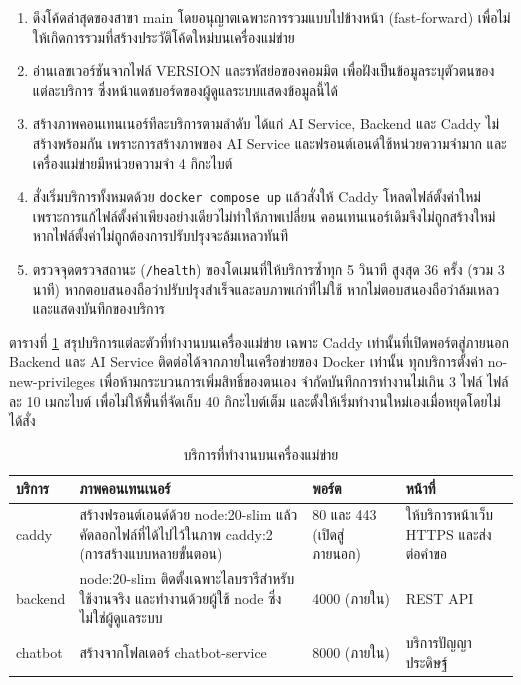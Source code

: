 \begin{enumerate}[label=(\arabic*),leftmargin=0pt,itemindent=\dimexpr\parindent+\parenlabelwidth+1em\relax,align=right,labelwidth=\parenlabelwidth,labelsep=1em]
\item ดึงโค้ดล่าสุดของสาขา main โดยอนุญาตเฉพาะการรวมแบบไปข้างหน้า (fast-forward) เพื่อไม่ให้เกิดการรวมที่สร้างประวัติโค้ดใหม่บนเครื่องแม่ข่าย
\item อ่านเลขเวอร์ชันจากไฟล์ VERSION และรหัสย่อของคอมมิต เพื่อฝังเป็นข้อมูลระบุตัวตนของแต่ละบริการ ซึ่งหน้าแดชบอร์ดของผู้ดูแลระบบแสดงข้อมูลนี้ได้
\item สร้างภาพคอนเทนเนอร์ทีละบริการตามลำดับ ได้แก่ AI Service, Backend และ Caddy ไม่สร้างพร้อมกัน เพราะการสร้างภาพของ AI Service และฟรอนต์เอนด์ใช้หน่วยความจำมาก และเครื่องแม่ข่ายมีหน่วยความจำ 4 กิกะไบต์
\item สั่งเริ่มบริการทั้งหมดด้วย \texttt{docker compose up} แล้วสั่งให้ Caddy โหลดไฟล์ตั้งค่าใหม่ เพราะการแก้ไฟล์ตั้งค่าเพียงอย่างเดียวไม่ทำให้ภาพเปลี่ยน คอนเทนเนอร์เดิมจึงไม่ถูกสร้างใหม่ หากไฟล์ตั้งค่าไม่ถูกต้องการปรับปรุงจะล้มเหลวทันที
\item ตรวจจุดตรวจสถานะ (\texttt{/health}) ของโดเมนที่ให้บริการซ้ำทุก 5 วินาที สูงสุด 36 ครั้ง (รวม 3 นาที) หากตอบสนองถือว่าปรับปรุงสำเร็จและลบภาพเก่าที่ไม่ใช้ หากไม่ตอบสนองถือว่าล้มเหลวและแสดงบันทึกของบริการ
\end{enumerate}

ตารางที่ \ref{tab:deploy_services} สรุปบริการแต่ละตัวที่ทำงานบนเครื่องแม่ข่าย เฉพาะ Caddy เท่านั้นที่เปิดพอร์ตสู่ภายนอก Backend และ AI Service ติดต่อได้จากภายในเครือข่ายของ Docker เท่านั้น ทุกบริการตั้งค่า no-new-privileges เพื่อห้ามกระบวนการเพิ่มสิทธิ์ของตนเอง จำกัดบันทึกการทำงานไม่เกิน 3 ไฟล์ ไฟล์ละ 10 เมกะไบต์ เพื่อไม่ให้พื้นที่จัดเก็บ 40 กิกะไบต์เต็ม และตั้งให้เริ่มทำงานใหม่เองเมื่อหยุดโดยไม่ได้สั่ง

\begin{table}[H]
\centering
\caption{บริการที่ทำงานบนเครื่องแม่ข่าย}
\label{tab:deploy_services}
\begin{tabular}{|l|p{6.2cm}|p{2.2cm}|p{3cm}|}
\hline
\textbf{บริการ} & \textbf{ภาพคอนเทนเนอร์} & \textbf{พอร์ต} & \textbf{หน้าที่} \\
\hline
caddy & สร้างฟรอนต์เอนด์ด้วย node:20-slim แล้วคัดลอกไฟล์ที่ได้ไปไว้ในภาพ caddy:2 (การสร้างแบบหลายขั้นตอน) & 80 และ 443 (เปิดสู่ภายนอก) & ให้บริการหน้าเว็บ HTTPS และส่งต่อคำขอ \\ \hline
backend & node:20-slim ติดตั้งเฉพาะไลบรารีสำหรับใช้งานจริง และทำงานด้วยผู้ใช้ node ซึ่งไม่ใช่ผู้ดูแลระบบ & 4000 (ภายใน) & REST API \\ \hline
chatbot & สร้างจากโฟลเดอร์ chatbot-service & 8000 (ภายใน) & บริการปัญญาประดิษฐ์ \\
\hline
\end{tabular}
\end{table}

